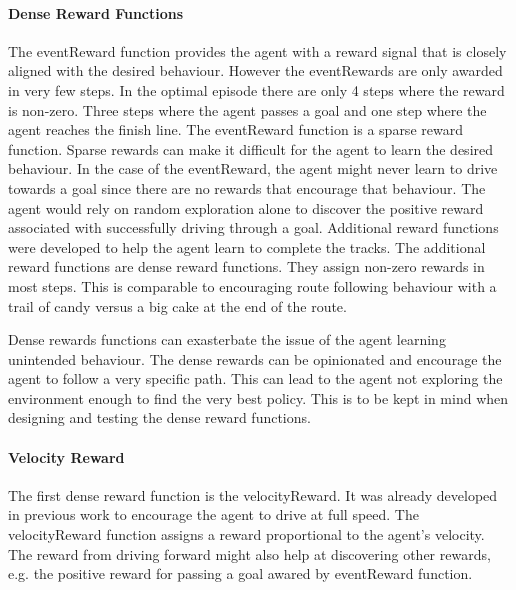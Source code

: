 \paragraph*{Dense Reward Functions}
The eventReward function provides the agent with a reward signal that is closely aligned with the desired behaviour. However the eventRewards are only awarded in very few steps. In the optimal episode there are only 4 steps where the reward is non-zero. Three steps where the agent passes a goal and one step where the agent reaches the finish line. The eventReward function is a sparse reward function. Sparse rewards can make it difficult for the agent to learn the desired behaviour. In the case of the eventReward, the agent might never learn to drive towards a goal since there are no rewards that encourage that behaviour. The agent would rely on random exploration alone to discover the positive reward associated with successfully driving through a goal.
Additional reward functions were developed to help the agent learn to complete the tracks. The additional reward functions are dense reward functions. They assign non-zero rewards in most steps. This is comparable to encouraging route following behaviour with a trail of candy versus a big cake at the end of the route. 


Dense rewards functions can exasterbate the issue of the agent learning unintended behaviour. The dense rewards can be opinionated and encourage the agent to follow a very specific path. This can lead to the agent not exploring the environment enough to find the very best policy. This is to be kept in mind when designing and testing the dense reward functions.


\paragraph{Velocity Reward}
The first dense reward function is the velocityReward. It was already developed in previous work \autocite{maximilian} to encourage the agent to drive at full speed. The velocityReward function assigns a reward proportional to the agent's velocity. The reward from driving forward might also help at discovering other rewards, e.g. the positive reward for passing a goal awared by eventReward function. 

